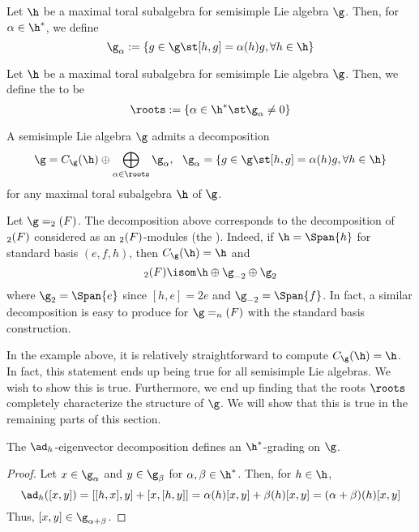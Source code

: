 \documentclass[11pt,leqno,oneside]{amsart}
\numberwithin{thm}{section}
\begin{document}
\begin{defn}
  Let \(\h\) be a maximal toral subalgebra for semisimple Lie algebra
  \(\g\). Then, for \(\alpha \in \h^*\), we define \[
    \g_\alpha := \{g \in \g \st [h,g] = \alpha(h)g, \forall h \in \h\}
  \]
\end{defn}
\begin{defn}
  Let \(\h\) be a maximal toral subalgebra for semisimple Lie algebra
  \(\g\). Then, we define the 
  to be \[
    \roots := \{\alpha \in \h^* \st \g_\alpha \neq 0\}
  \]
\end{defn}
\begin{thm}
  A semisimple Lie algebra \(\g\) admits a decomposition \[
    \g = C_\g(\h) \oplus \bigoplus_{\alpha \in \roots} \g_\alpha, \ \
    \g_\alpha = \{g \in \g \st [h,g] = \alpha(h)g, \forall h \in \h\}
  \]
  for any maximal toral subalgebra \(\h\) of \(\g\).
\end{thm}
\begin{example}
  Let \(\g = \sl_2(F)\). The decomposition above corresponds to
  the decomposition of \(\sl_2(F)\) considered as an
  \(\sl_2(F)\)-modules (the ). Indeed, if
  \(\h = \Span\{h\}\) for standard basis \((e,f,h)\), then \(C_\g(\h)
  = \h\) and \[
    \sl_2(F) \isom \h \oplus \g_{-2} \oplus \g_2
  \]
  where \(\g_2 = \Span\{e\}\) since \([h,e] = 2e\) and \(\g_{-2} =
  \Span\{f\}\). In fact, a similar decomposition is easy to produce
  for \(\g = \sl_n(F)\) with the standard basis construction.
\end{example}
\begin{rmk}
  In the example above, it is relatively straightforward to compute
\(C_\g(\h) = \h\). In fact, this statement ends up being true for all
semisimple Lie algebras. We wish to show this is true. Furthermore, we
end up finding that the roots \(\roots\) completely characterize the structure
of \(\g\). We will show that this is true in the remaining parts of
this section.
\end{rmk}
\begin{prop}
  The \(\ad_h\)-eigenvector decomposition defines an \(\h^*\)-grading
  on \(\g\).
\end{prop}
\begin{proof}
  Let \(x \in \g_\alpha\) and \(y \in \g_\beta\) for \(\alpha,\beta
  \in \h^*\). Then, for \(h \in \h\), \[
    \ad_h([x,y]) = [[h,x],y] + [x,[h,y]] = \alpha(h)[x,y] +
    \beta(h)[x,y] = (\alpha+\beta)(h)[x,y]
  \]
  Thus, \([x,y] \in \g_{\alpha+\beta}\).
\end{proof}
\end{document}
